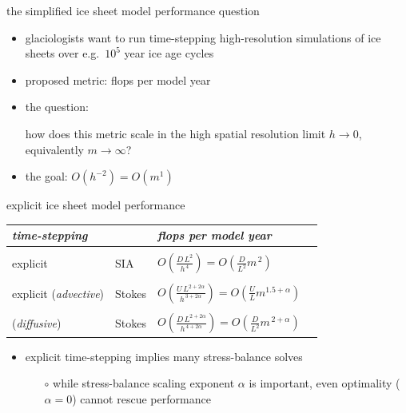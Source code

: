 \documentclass[svgnames,
               hyperref={colorlinks,citecolor=DeepPink4,linkcolor=FireBrick,urlcolor=Maroon},
               usepdftitle=false]  %
               {beamer}
\newcommand{\oo}[1]{\displaystyle O\left(#1\right)}
\begin{document}
\begin{frame}{the simplified ice sheet model performance question}

\begin{itemize}
\item glaciologists want to run time-stepping high-resolution simulations of ice sheets over e.g.~$10^5$ year ice age cycles

\bigskip
\item proposed metric: \quad \alert{flops per model year}

\bigskip
\item the question:

\bigskip
\begin{center}
\begin{minipage}{0.82\textwidth}
how does this metric \alert{scale} in the \alert{high spatial resolution limit} $h\to 0$, equivalently $m\to \infty$?
\end{minipage}
\end{center}

\bigskip
\item the goal: \hspace{20mm} $O(h^{-2}) = O(m^1)$
\end{itemize}
\end{frame}


\begin{frame}{explicit ice sheet model performance}

\begin{tabular}{llll}
\emph{time-stepping} &  & \emph{flops per model year} \\ \hline
\\
explicit & SIA    & $\oo{\frac{D\, L^2}{h^{\,4}}} = \oo{\frac{D}{L^2} m^{\,2}}$ \\
\\
explicit ({\footnotesize \emph{advective}}) & Stokes \phantom{xxxx} & $\oo{\frac{U \,L^{2+2\alpha}}{h^{\,3+2\alpha}}} = \oo{\frac{U}{L} m^{1.5+\alpha}}$ \\
\\
\phantom{explicit} ({\footnotesize \emph{diffusive}})  & Stokes & $\oo{\frac{D\, L^{2+2\alpha}}{h^{\,4+2\alpha}}} = \oo{\frac{D}{L^2} m^{\,2+\alpha}}$
\end{tabular}


\vspace{10mm}
\begin{itemize}
\item explicit time-stepping implies \alert{many stress-balance solves}
    \begin{itemize}
    \item[$\circ$] while stress-balance scaling exponent $\alpha$ is important, even optimality ($\alpha=0$) cannot rescue performance
    \end{itemize}
\end{itemize}
\end{frame}
\end{document}
